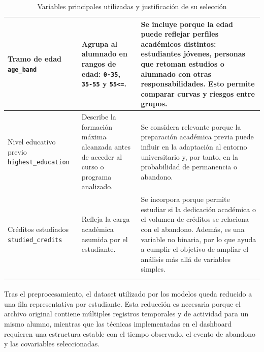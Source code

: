 \begin{longtable}{|>{\raggedright\arraybackslash}p{3.2cm}|>{\raggedright\arraybackslash}p{4.2cm}|>{\raggedright\arraybackslash}p{6.1cm}|}
Tramo de edad \newline \texttt{age\_band} & Agrupa al alumnado en rangos de edad: \texttt{0-35}, \texttt{35-55} y \texttt{55<=}. & Se incluye porque la edad puede reflejar perfiles académicos distintos: estudiantes jóvenes, personas que retoman estudios o alumnado con otras responsabilidades. Esto permite comparar curvas y riesgos entre grupos. \\ \hline

Nivel educativo previo \newline \texttt{highest\_education} & Describe la formación máxima alcanzada antes de acceder al curso o programa analizado. & Se considera relevante porque la preparación académica previa puede influir en la adaptación al entorno universitario y, por tanto, en la probabilidad de permanencia o abandono. \\ \hline

Créditos estudiados \newline \texttt{studied\_credits} & Refleja la carga académica asumida por el estudiante. & Se incorpora porque permite estudiar si la dedicación académica o el volumen de créditos se relaciona con el abandono. Además, es una variable no binaria, por lo que ayuda a cumplir el objetivo de ampliar el análisis más allá de variables simples. \\ \hline

\caption{Variables principales utilizadas y justificación de su selección}
\label{tab:variables_analisis}\\
\end{longtable}
\normalsize

\paragraph*{}Tras el preprocesamiento, el dataset utilizado por los modelos queda reducido a una fila representativa por estudiante. Esta reducción es necesaria porque el archivo original contiene múltiples registros temporales y de actividad para un mismo alumno, mientras que las técnicas implementadas en el dashboard requieren una estructura estable con el tiempo observado, el evento de abandono y las covariables seleccionadas.

